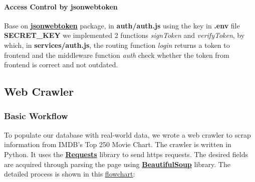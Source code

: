 \begin{CJK*}{UTF8}{gbsn}
\paragraph{Access Control by jsonwebtoken}
\label{sec:access}
Base on \textbf{\href{https://www.npmjs.com/package/jsonwebtoken}{jsonwebtoken}} package, in \textbf{auth/auth.js} using the key in \textbf{.env} file \textbf{SECRET\_KEY} we implemented 2 functions \textit{signToken} and \textit{verifyToken}, by which, in \textbf{services/auth.js}, the routing function \textit{login} returns a token to frontend and the middleware function \textit{auth} check whether the token from frontend is correct and not outdated.

\subsection{Web Crawler}
\subsubsection{Basic Workflow}
To populate our database with real-world data, we wrote a web crawler to scrap information from IMDB's Top 250 Movie Chart. The crawler is written in Python. It uses the \textbf{\href{https://docs.python-requests.org/en/latest/}{Requests}} library to send https requests. The desired fields are acquired through parsing the page using \textbf{\href{https://www.crummy.com/software/BeautifulSoup/bs4/doc/}{BeautifulSoup}} library.
The detailed process is shown in this \hyperref[crawler]{flowchart}:\par


\end{CJK*}
